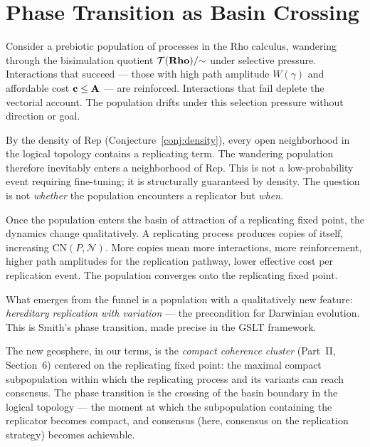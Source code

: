 \section{Phase Transition as Basin Crossing}

\begin{remark}
Consider a prebiotic population of processes in the Rho calculus,
wandering through the bisimulation quotient $\mathcal{T}(\mathbf{Rho})/{\sim}$
under selective pressure.
Interactions that succeed --- those with high path amplitude
$W(\gamma)$ and affordable cost $\mathbf{c} \leq \mathbf{A}$ ---
are reinforced.
Interactions that fail deplete the vectorial account.
The population drifts under this selection pressure without
direction or goal.
\end{remark}

\begin{remark}
By the density of $\mathrm{Rep}$ (Conjecture~\ref{conj:density}),
every open neighborhood in the logical topology contains a
replicating term.
The wandering population therefore inevitably enters a neighborhood
of $\mathrm{Rep}$.
This is not a low-probability event requiring fine-tuning; it is
structurally guaranteed by density.
The question is not \emph{whether} the population encounters a
replicator but \emph{when}.
\end{remark}

\begin{remark}
Once the population enters the basin of attraction of a replicating
fixed point, the dynamics change qualitatively.
A replicating process produces copies of itself, increasing
$\mathrm{CN}(P, \mathcal{N})$.
More copies mean more interactions, more reinforcement, higher
path amplitudes for the replication pathway, lower effective cost
per replication event.
The population converges onto the replicating fixed point.

What emerges from the funnel is a population with a qualitatively
new feature: \emph{hereditary replication with variation} ---
the precondition for Darwinian evolution.
This is Smith's phase transition, made precise in the GSLT
framework.

The new geosphere, in our terms, is the \emph{compact coherence
cluster} (Part~II, Section~6) centered on the replicating fixed
point: the maximal compact subpopulation within which the
replicating process and its variants can reach consensus.
The phase transition is the crossing of the basin boundary in
the logical topology --- the moment at which the subpopulation
containing the replicator becomes compact, and consensus (here,
consensus on the replication strategy) becomes achievable.
\end{remark}

